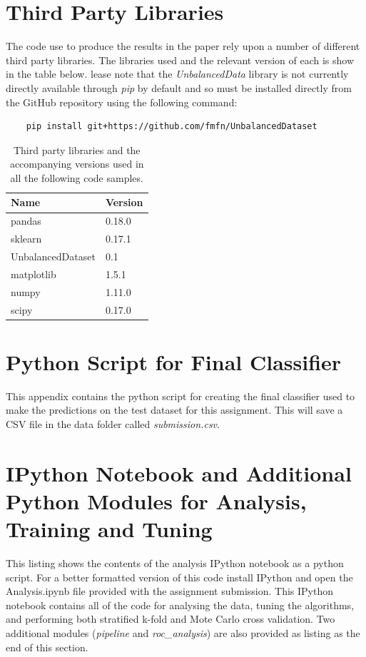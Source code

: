 \documentclass[journal]{IEEEtran}
\begin{document}
\clearpage
\onecolumn
\appendices

\section{Third Party Libraries}
The code use to produce the results in the paper rely upon a number of different third party libraries. The libraries used and the relevant version of each is show in the table below. lease note that the \textit{UnbalancedData} library is not currently directly available through \textit{pip} by default and so must be installed directly from the GitHub repository using the following command:

\begin{lstlisting}
	pip install git+https://github.com/fmfn/UnbalancedDataset
\end{lstlisting}

\begin{table}[H]
\centering
\caption{Third party libraries and the accompanying versions used in all the following code samples.}
\label{my-label}
\begin{tabular}{|l|l|}
\hline
\textbf{Name}     & \textbf{Version} \\ \hline
pandas            & 0.18.0           \\ \hline
sklearn           & 0.17.1           \\ \hline
UnbalancedDataset & 0.1              \\ \hline
matplotlib        & 1.5.1            \\ \hline
numpy             & 1.11.0           \\ \hline
scipy             & 0.17.0           \\ \hline
\end{tabular}
\end{table}

\section{Python Script for Final Classifier}
\label{appendix:final-classifier}
This appendix contains the python script for creating the final classifier used to make the predictions on the test dataset for this assignment. This will save a CSV file in the data folder called \textit{submission.csv}.



\section{IPython Notebook and Additional Python Modules for Analysis, Training and Tuning}
This listing shows the contents of the analysis IPython notebook as a python script. For a better formatted version of this code install IPython and open the Analysis.ipynb file provided with the assignment submission. This IPython notebook contains all of the code for analysing the data, tuning the algorithms, and performing both stratified k-fold and Mote Carlo cross validation. Two additional modules (\textit{pipeline} and \textit{roc\_analysis}) are also provided as listing as the end of this section.
\end{document}
